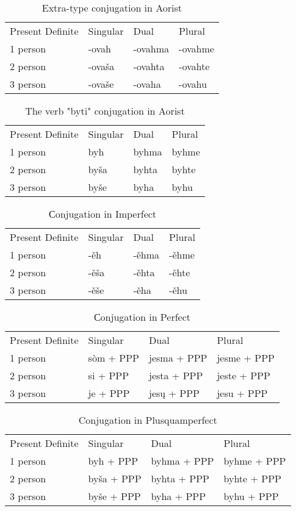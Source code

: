 \begin{table}[!htb]
	\caption{Extra-type conjugation in Aorist}
	\begin{tabular}{llll}
		Present Definite & Singular & Dual & Plural \\
		1 person & -ovah & -ovahma & -ovahme \\
		2 person & -ovaša & -ovahta & -ovahte \\
		3 person & -ovaše & -ovaha & -ovahu
	\end{tabular}
\end{table}

\begin{table}[!htb]
	\caption{The verb "byti" conjugation in Aorist}
	\begin{tabular}{llll}
		Present Definite & Singular & Dual & Plural \\
		1 person & byh & byhma & byhme \\
		2 person & byša & byhta & byhte \\
		3 person & byše & byha & byhu 
	\end{tabular}
\end{table}

\begin{table}[!htb]
	\caption{Сonjugation in Imperfect}
	\begin{tabular}{llll}
		Present Definite & Singular & Dual & Plural \\
		1 person & -ěh & -ěhma & -ěhme \\
		2 person & -ěša & -ěhta & -ěhte \\
		3 person & -ěše & -ěha & -ěhu
	\end{tabular}
\end{table}

\begin{table}[!htb]
	\caption{Сonjugation in Perfect}
	\begin{tabular}{llll}
		Present Definite & Singular & Dual & Plural \\
		1 person & sòm + PPP & jesma + PPP & jesme + PPP \\
		2 person & si + PPP & jesta + PPP & jeste  + PPP \\
		3 person & je + PPP & jesų + PPP & jesu + PPP 
	\end{tabular}
\end{table}

\begin{table}[!htb]
	\caption{Conjugation in Plusquamperfect}
	\begin{tabular}{llll}
		Present Definite & Singular & Dual & Plural \\
		1 person & byh + PPP & byhma + PPP & byhme + PPP \\
		2 person & byša + PPP & byhta + PPP & byhte  + PPP \\
		3 person & byše + PPP & byha + PPP & byhu + PPP 
	\end{tabular}
\end{table}

